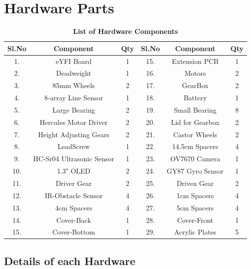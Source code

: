 \documentclass[12pt,a4paper,oneside]{book}
\begin{document}
		
	\section*{Hardware Parts}
		\begin{table}[H]
		\def\arraystretch{1.5}
		\caption{\textbf{List of Hardware Components}}
		\vspace{1cm}
		\begin{tabular}{|c|c|c||c|c|c|}
			\hline
			\textbf{Sl.No} & \textbf{Component} & \textbf{Qty} & \textbf{Sl.No} & \textbf{Component} & \textbf{Qty}\\\hline
			1. & eYFI Board & 1 & 15. & Extension PCB & 1 \\\hline
			2. & Deadweight & 1 & 16. & Motors & 2 \\\hline
			3. & 85mm Wheels & 2 & 17. & GearBox & 2 \\\hline
			4. & 8-array Line Sensor & 1 & 18. & Battery & 1 \\\hline
			5. & Large Bearing & 2 & 19. & Small Bearing & 8 \\\hline
			6. & Hercules Motor Driver & 2 & 20. & Lid for Gearbox & 2 \\\hline
			7. & Height Adjusting Gears & 2 & 21. & Castor Wheels & 2 \\\hline
			8. & LeadScrew & 1 & 22. & 14.5cm Spacers & 4 \\\hline
			9. & HC-Sr04 Ultrasonic Sensor & 1 & 23. & OV7670 Camera & 1 \\\hline
			10. & 1.3" OLED & 2 & 24. & GY87 Gyro Sensor & 1 \\\hline
			11. & Driver Gear & 2 & 25. & Driven Gear & 2 \\\hline
			12. & IR-Obstacle Sensor & 4 & 26. & 1cm Spacers & 4 \\\hline
			13. & 4cm Spacers & 4 & 27. & 5cm Spacers & 4 \\\hline
			14. & Cover-Back & 1 & 28. & Cover-Front & 1 \\\hline
			15. & Cover-Bottom & 1 & 29. & Acrylic Plates & 5 \\\hline			
		\end{tabular}
		\end{table}
		\pagebreak

		\subsection*{Details of each Hardware}
\end{document}
